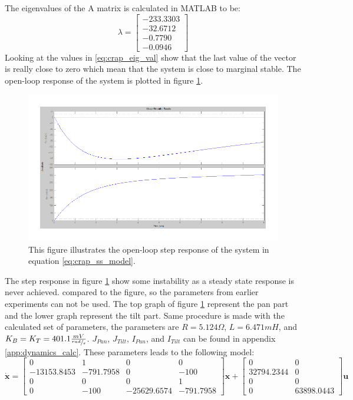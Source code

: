 The eigenvalues of the A matrix is calculated in MATLAB to be:
\begin{equation}
 \lambda =
 \begin{bmatrix}
   - 233.3303\\
   - 32.6712\\
   - 0.7790\\
   - 0.0946
 \end{bmatrix}\label{eq:crap_eig_val}
\end{equation}
Looking at the values in \ref{eq:crap_eig_val} show that the last value of the vector is really close to zero which mean that the system is close to marginal stable. The open-loop response of the system is plotted in figure \ref{fig:crap_step}.
\begin{figure}[htb]
	\centering
	\includegraphics[width=\textwidth,trim=0 0 0 0]{graphics/CrapSim.pdf} %
	\caption{This figure illustrates the open-loop step response of the system in equation \ref{eq:crap_ss_model}.}
	\label{fig:crap_step}			%
\end{figure}
The step response in figure \ref{fig:crap_step} show some instability as a steady state response is never achieved.  compared to the figure, so the parameters from earlier experiments can not be used. The top graph of figure \ref{fig:crap_step} represent the pan part and the lower graph represent the tilt part. Same procedure is made with the calculated set of parameters, the parameters are $R = 5.124\Omega$, $L = 6.471mH$, and $K_B = K_T = 401.1 \frac{mV}{\sfrac{rad}{s}}$. $J_{Pan}$, $J_{Tilt}$, $I_{Pan}$, and $I_{Tilt}$ can be found in appendix \ref{app:dynamics_calc}.
These parameters leads to the following model:
\begin{equation}
 \dot{\textbf{x}} =
 \begin{bmatrix}
   0 & 1 & 0 & 0\\
   - 13153.8453 & - 791.7958 & 0 & - 100\\
   0 & 0 & 0 & 1\\
   0 & - 100 & - 25629.6574 & - 791.7958
 \end{bmatrix}
 \textbf{x} +
 \begin{bmatrix}
   0 & 0\\
   32794.2344 & 0\\
   0 & 0\\
   0 & 63898.0443
 \end{bmatrix}
 \textbf{u}\label{eq:super_ss_model}
\end{equation}
